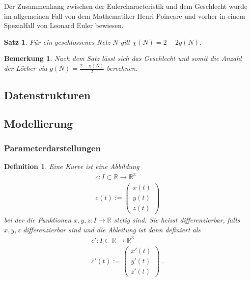 \documentclass[]{article}
\newtheorem{Definition}{Definition}
\newtheorem{Satz}{Satz}
\newtheorem{Bemerkung}{Bemerkung}
\begin{document}
Der Zusammenhang zwischen der Eulercharacteristik und dem Geschlecht wurde im allgemeinen Fall von dem Mathematiker  
Henri Poincare und vorher in einem Spezialfall von Leonard Euler bewiesen. 
\begin{Satz}
Für ein geschlossenes Netz $N$ gilt $\chi(N) = 2 - 2g(N)$. 
\end{Satz}

\begin{Bemerkung}
Nach dem Satz lässt sich das Geschlecht und somit die Anzahl der Löcher via $g(N) = \frac{2- \chi(N)}{2}$ berechnen.
\end{Bemerkung}

\subsection{Datenstrukturen}

\subsection{Modellierung}

\subsubsection{Parameterdarstellungen}

\begin{Definition}
Eine Kurve ist eine  Abbildung 
\begin{align*}
c: I \subset \mathbb{R} \to \mathbb{R}^3 \\
c(t) := \begin{pmatrix} x(t) \\  y(t) \\ z(t) \end{pmatrix}
\end{align*}
bei der die Funktionen $x, y, z : I \to \mathbb{R}$ stetig sind. Sie heisst differenzierbar, falls $x,y,z$ differenzierbar sind und die Ableitung ist dann definiert als 
\begin{align*}
c': I \subset \mathbb{R} \to \mathbb{R}^3 \\
c'(t) := \begin{pmatrix} x'(t) \\  y'(t) \\ z'(t) \end{pmatrix} \; .
\end{align*}
 \end{Definition}
\end{document}
